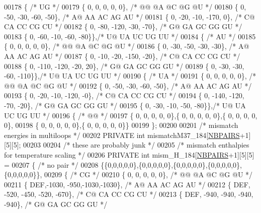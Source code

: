 \begin{DoxyCode}
00178   \{ \textcolor{comment}{/* UG */}
00179    \{   0,    0,    0,    0,    0\}, \textcolor{comment}{/* @@  @A  @C  @G  @U */}
00180    \{   0,  -50,  -30,  -60,  -50\}, \textcolor{comment}{/* A@  AA  AC  AG  AU */}
00181    \{   0,  -20,  -10, -170,    0\}, \textcolor{comment}{/* C@  CA  CC  CG  CU */}
00182    \{   0,  -80, -120,  -30,  -70\}, \textcolor{comment}{/* G@  GA  GC  GG  GU */}
00183    \{   0,  -60,  -10,  -60,  -80\}\},\textcolor{comment}{/* U@  UA  UC  UG  UU */}
00184   \{ \textcolor{comment}{/* AU */}
00185    \{   0,    0,    0,    0,    0\}, \textcolor{comment}{/* @@  @A  @C  @G  @U */}
00186    \{   0,  -30,  -50,  -30,  -30\}, \textcolor{comment}{/* A@  AA  AC  AG  AU */}
00187    \{   0,  -10,  -20, -150,  -20\}, \textcolor{comment}{/* C@  CA  CC  CG  CU */}
00188    \{   0, -110, -120,  -20,   20\}, \textcolor{comment}{/* G@  GA  GC  GG  GU */}
00189    \{   0,  -30,  -30,  -60, -110\}\},\textcolor{comment}{/* U@  UA  UC  UG  UU */}
00190   \{ \textcolor{comment}{/* UA */}
00191    \{   0,    0,    0,    0,    0\}, \textcolor{comment}{/* @@  @A  @C  @G  @U */}
00192    \{   0,  -50,  -30,  -60,  -50\}, \textcolor{comment}{/* A@  AA  AC  AG  AU */}
00193    \{   0,  -20,  -10, -120,   -0\}, \textcolor{comment}{/* C@  CA  CC  CG  CU */}
00194    \{   0, -140, -120,  -70,  -20\}, \textcolor{comment}{/* G@  GA  GC  GG  GU */}
00195    \{   0,  -30,  -10,  -50,  -80\}\},\textcolor{comment}{/* U@  UA  UC  UG  UU */}
00196   \{ \textcolor{comment}{/* @@ */}
00197    \{  0,  0,  0,  0,  0\},\{  0,  0,  0,  0,  0\},\{  0,  0,  0,  0,  0\},
00198    \{  0,  0,  0,  0,  0\},\{  0,  0,  0,  0,  0\}\}
00199 \};
00200 
00201 \textcolor{comment}{/* mismatch energies in multiloops */}
00202 PRIVATE \textcolor{keywordtype}{int} mismatchM37\_184[\hyperlink{energy__const_8h_a5e75221c779d618eab81e096f37e32ce}{NBPAIRS}+1][5][5];
00203 
00204 \textcolor{comment}{/* these are probably junk */}
00205 \textcolor{comment}{/* mismatch enthalpies for temperature scaling */}
00206 PRIVATE \textcolor{keywordtype}{int} mism\_H\_184[\hyperlink{energy__const_8h_a5e75221c779d618eab81e096f37e32ce}{NBPAIRS}+1][5][5] =
00207 \{ \textcolor{comment}{/* no pair */}
00208   \{\{0,0,0,0,0\},\{0,0,0,0,0\},\{0,0,0,0,0\},\{0,0,0,0,0\},\{0,0,0,0,0\}\},
00209   \{ \textcolor{comment}{/* CG */}
00210    \{   0,    0,    0,    0,    0\}, \textcolor{comment}{/* @@  @A  @C  @G  @U */}
00211    \{ DEF,-1030, -950,-1030,-1030\}, \textcolor{comment}{/* A@  AA  AC  AG  AU */}
00212    \{ DEF, -520, -450, -520, -670\}, \textcolor{comment}{/* C@  CA  CC  CG  CU */}
00213    \{ DEF, -940, -940, -940, -940\}, \textcolor{comment}{/* G@  GA  GC  GG  GU */}

\end{DoxyCode}
